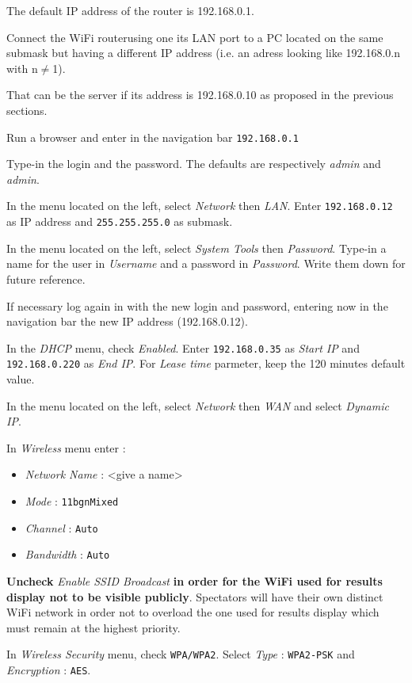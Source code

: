 \documentclass[a4paper]{ffco-rapport}
\begin{document}
	The default IP address of the router is 192.168.0.1.
	
	Connect the WiFi routerusing one its LAN port to a PC located on the same submask but having a different IP address (i.e. an adress looking like 192.168.0.n with n$\neq$1).
	
	That can be the server if its address is 192.168.0.10 as proposed in the previous sections.
	
	Run a browser and enter in the navigation bar \verb|192.168.0.1|

	Type-in the login and the password. The defaults are respectively \emph{admin} and \emph{admin}.
	
	In the menu located on the left, select \emph{Network} then \emph{LAN}. Enter \texttt{192.168.0.12} as IP address and \texttt{255.255.255.0} as submask.

	In the menu located on the left, select \emph{System Tools} then \emph{Password}. Type-in a name for the user in \emph{Username} and a password in \emph{Password}. Write them down for future reference.
	
  If necessary log again in with the new login and password, entering now in the navigation bar the new IP address (192.168.0.12).

	In the \emph{DHCP} menu, check \emph{Enabled}. Enter \texttt{192.168.0.35} as \emph{Start IP} and \texttt{192.168.0.220} as \emph{End IP}.
	For \emph{Lease time} parmeter, keep the 120 minutes default value.

	In the menu located on the left, select \emph{Network} then \emph{WAN} and select \emph{Dynamic IP}.
	
	In \emph{Wireless} menu enter :
		
	\begin{itemize}
		\item \emph{Network Name} : <give a name>
		\item \emph{Mode} : \texttt{11bgnMixed}
		\item \emph{Channel} : \texttt{Auto}
		\item \emph{Bandwidth} : \texttt{Auto}
	\end{itemize}
	
	\textbf{Uncheck} \emph{Enable SSID Broadcast} \textbf{in order for the WiFi used for results display not to be visible publicly}.
	Spectators will have their own distinct WiFi network in order not to overload the one used for results display which must remain at the highest priority.

	In \emph{Wireless Security} menu, check \texttt{WPA/WPA2}. Select \emph{Type} : \texttt{WPA2-PSK} and \emph{Encryption} : \texttt{AES}.
\end{document}
